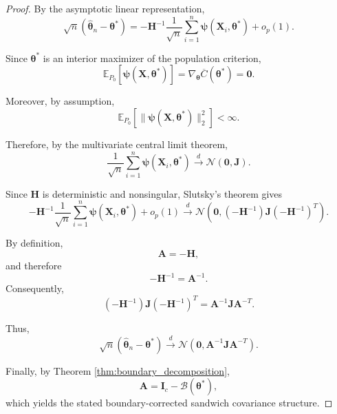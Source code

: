 \documentclass[pdflatex,sn-mathphys-ay]{sn-jnl}%
\let\oldtheta\theta
\renewcommand{\theta}{\boldsymbol{\oldtheta}}
\theoremstyle{thmstyleone}%
\theoremstyle{thmstyletwo}%
\theoremstyle{thmstylethree}%
\begin{document}
\begin{proof}

By the asymptotic linear representation,
\[
    \sqrt{n}
    \left(
        \widehat{\boldsymbol{\theta}}_n
        -
        \boldsymbol{\theta}^*
    \right)
    =
    -\mathbf{H}^{-1}
    \frac{1}{\sqrt{n}}
    \sum_{i=1}^n
    \boldsymbol{\psi}
    (\mathbf{X}_i,\boldsymbol{\theta}^*)
    +
    o_p(1).
\]

Since $\boldsymbol{\theta}^*$ is an interior maximizer of the population criterion,
\[
    \mathbb{E}_{P_0}
    \left[
        \boldsymbol{\psi}
        (\mathbf{X},\boldsymbol{\theta}^*)
    \right]
    =
    \nabla_{\boldsymbol{\theta}}
    \overline{C}
    (\boldsymbol{\theta}^*)
    =
    \mathbf{0}.
\]

Moreover, by assumption,
\[
    \mathbb{E}_{P_0}
    \left[
        \|
            \boldsymbol{\psi}
            (\mathbf{X},\boldsymbol{\theta}^*)
        \|_2^2
    \right]
    <
    \infty.
\]

Therefore, by the multivariate central limit theorem,
\[
    \frac{1}{\sqrt{n}}
    \sum_{i=1}^n
    \boldsymbol{\psi}
    (\mathbf{X}_i,\boldsymbol{\theta}^*)
    \xrightarrow{d}
    \mathcal{N}
    (
        \mathbf{0},
        \mathbf{J}
    ).
\]

Since $\mathbf{H}$ is deterministic and nonsingular, Slutsky's theorem gives
\[
    -\mathbf{H}^{-1}
    \frac{1}{\sqrt{n}}
    \sum_{i=1}^n
    \boldsymbol{\psi}
    (\mathbf{X}_i,\boldsymbol{\theta}^*)
    +
    o_p(1)
    \xrightarrow{d}
    \mathcal{N}
    \left(
        \mathbf{0},
        (-\mathbf{H}^{-1})
        \mathbf{J}
        (-\mathbf{H}^{-1})^T
    \right).
\]

By definition,
\[
    \mathbf{A}
    =
    -\mathbf{H},
\]
and therefore
\[
    -\mathbf{H}^{-1}
    =
    \mathbf{A}^{-1}.
\]
Consequently,
\[
    (-\mathbf{H}^{-1})
    \mathbf{J}
    (-\mathbf{H}^{-1})^T
    =
    \mathbf{A}^{-1}
    \mathbf{J}
    \mathbf{A}^{-T}.
\]

Thus,
\[
    \sqrt{n}
    \left(
        \widehat{\boldsymbol{\theta}}_n
        -
        \boldsymbol{\theta}^*
    \right)
    \xrightarrow{d}
    \mathcal{N}
    \left(
        \mathbf{0},
        \mathbf{A}^{-1}
        \mathbf{J}
        \mathbf{A}^{-T}
    \right).
\]

Finally, by Theorem
\ref{thm:boundary_decomposition},
\[
    \mathbf{A}
    =
    \mathbf{I}_c
    -
    \mathcal{B}
    (\boldsymbol{\theta}^*),
\]
which yields the stated boundary-corrected sandwich covariance structure.

\end{proof}
\end{document}
